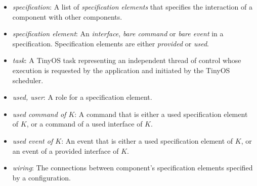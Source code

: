 \documentclass[11pt,letterpaper]{article}
\newcommand{\tinyos}{TinyOS\xspace}
\begin{document}
\begin{itemize}
\item \emph{specification}: A list of \emph{specification elements} that
specifies the interaction of a component with other components.

\item \emph{specification element}: An \emph{interface}, \emph{bare
command} or \emph{bare event} in a specification. Specification elements
are either \emph{provided} or \emph{used}.

\item \emph{task}: A \tinyos task representing an independent thread of
control whose execution is requested by the application and initiated
by the \tinyos scheduler.

\item \emph{used, user}: A role for a specification element.

\item \emph{used command of $K$}: A command that is either a used specification
element of $K$, or a command of a used interface of $K$.

\item \emph{used event of $K$}: An event that is either a used specification
element of $K$, or an event of a provided interface of $K$.

\item \emph{wiring}: The connections between component's specification
elements specified by a configuration.

\end{itemize}




\end{document}

